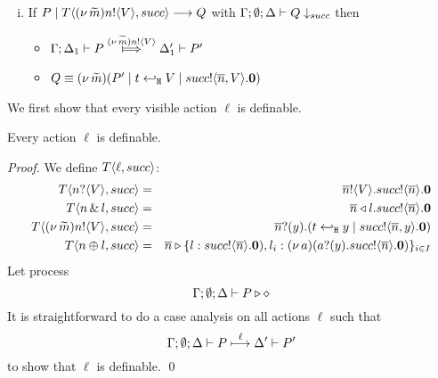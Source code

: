 \begin{definition}[Definability]
\begin{enumerate}
\begin{enumerate}[i.]
				\item	If $P \;|\; T\langle (\nu\, \widetilde{m})n ! \langle V \rangle, succ \rangle \longrightarrow Q$
						with $\Gamma; \emptyset; \Delta \vdash Q \downarrow_{succ}$ then 
						\begin{itemize}
							\item $\horel{\Gamma}{\Delta_1}{P}{\Hby{\news{\widetilde{m}}\bactout{n}{V}}}{\Delta_1'}{P'}$
							\item $Q \equiv (\nu\, \widetilde{m})(P' \;|\; t \hookleftarrow_{\mathtt{H}} V \;|\; succ ! \langle \overline{n}, V \rangle . \mathbf{0})$
						\end{itemize}
			\end{enumerate}
	\end{enumerate}	
%
\end{definition}

We first show that every visible action $\ell$ is definable.

\begin{lemma}[Definability]
	\label{lem:definibility}
	Every action $\ell$ is definable.
\end{lemma}

\begin{proof}
	\noi We define $T\langle \ell, succ \rangle$:
	\begin{eqnarray*}
		T\langle n ? \langle V \rangle, succ \rangle &=&
		\overline{n} ! \langle V \rangle . succ ! \langle \overline{n} \rangle . \mathbf{0}
		\\
		T\langle n \,\&\, l, succ \rangle &=&
		\overline{n} \triangleleft l . succ ! \langle \overline{n} \rangle . \mathbf{0}
		\\
		T\langle (\nu\, \widetilde{m}) n ! \langle V \rangle, succ \rangle &=&
		\overline{n} ? (y) . (t \hookleftarrow_{\mathtt{H}} y \;|\; succ ! \langle \overline{n}, y \rangle . \mathbf{0})
		\\
		T\langle n \oplus l, succ \rangle &=&
		\overline{n} \triangleright \{l: succ ! \langle \overline{n} \rangle . \mathbf{0}), l_i: (\nu\, a)(a ? (y) . succ ! \langle \overline{n} \rangle . \mathbf{0})\}_{i \in I}
	\end{eqnarray*}
%		
	\noi Let process 
	\[
		\Gamma; \emptyset; \Delta \vdash P \triangleright \diamond
	\]
	\noi	It is straightforward to do a case analysis
			on all actions $\ell$ such that
			\[
				\Gamma; \emptyset; \Delta \vdash P \stackrel{\ell}{\longmapsto} \Delta' \vdash P'
			\]
			to show that $\ell$ is definable.
	\qed
\end{proof}

